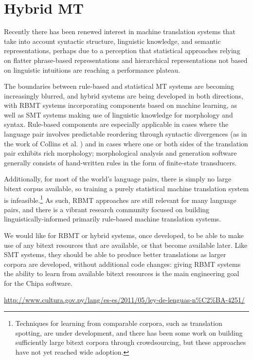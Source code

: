 \section{Hybrid MT}
Recently there has been renewed interest in machine translation systems that
take into account syntactic structure, linguistic knowledge, and semantic
representations, perhaps due to a perception that statistical approaches
relying on flatter phrase-based representations and hierarchical
representations not based on linguistic intuitions are reaching a performance
plateau.

The boundaries between rule-based and statistical MT systems are becoming
increasingly blurred, and hybrid systems are being developed in both
directions, with RBMT systems incorporating components based on machine
learning, as well as SMT systems making use of linguistic knowledge for
morphology and syntax.
Rule-based components are especially applicable in cases where the language
pair involves predictable reordering through syntactic divergences
(as in the work of Collins et al.
\cite{collins-koehn-kucerova:2005:ACL})
and in cases where one or both sides of the translation pair exhibits rich
morphology; morphological analysis and generation software generally consists
of hand-written rules in the form of finite-state transducers.

Additionally, for most of the world's language pairs, there is simply no large
bitext corpus available, so training a purely statistical machine translation
system is infeasible.\footnote{Techniques for learning from comparable corpora,
such as translation spotting, are under development, and there has been some
work on building sufficiently large bitext corpora through crowdsourcing, but
these approaches have not yet reached wide adoption.}
As such, RBMT approaches are still relevant for many language pairs, and there
is a vibrant research community focused on building linguistically-informed
primarily rule-based machine translation systems.

We would like for RBMT or hybrid systems, once developed, to be able to make
use of any bitext resources that are available, or that become available later.
Like SMT systems, they should be able to produce better translations as larger
corpora are developed, without additional code changes: giving RBMT systems the
ability to learn from available bitext resources is the main engineering goal
for the Chipa software.

\urldef{\leydelenguas}\url{http://www.cultura.gov.py/lang/es-es/2011/05/ley-de-lenguas-n%C2%BA-4251/}

